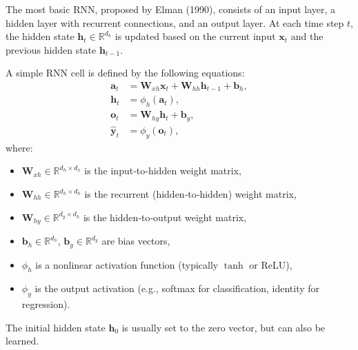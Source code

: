 \documentclass{tufte-handout}
\begin{document}
The most basic RNN, proposed by Elman (1990), consists of an input layer, a hidden layer with recurrent connections, and an output layer. At each time step $t$, the hidden state $\mathbf{h}_t \in \mathbb{R}^{d_h}$ is updated based on the current input $\mathbf{x}_t$ and the previous hidden state $\mathbf{h}_{t-1}$.

\begin{defn}
    A simple RNN cell is defined by the following equations:
    \begin{align}
        \mathbf{a}_t &= \mathbf{W}_{xh} \mathbf{x}_t + \mathbf{W}_{hh} \mathbf{h}_{t-1} + \mathbf{b}_h, \label{eq:rnn_pre} \\
        \mathbf{h}_t &= \phi_h(\mathbf{a}_t), \label{eq:rnn_hidden} \\
        \mathbf{o}_t &= \mathbf{W}_{hy} \mathbf{h}_t + \mathbf{b}_y, \label{eq:rnn_output} \\
        \hat{\mathbf{y}}_t &= \phi_y(\mathbf{o}_t), \label{eq:rnn_pred}
    \end{align}
    where:
    \begin{itemize}
        \item $\mathbf{W}_{xh} \in \mathbb{R}^{d_h \times d_x}$ is the input‑to‑hidden weight matrix,
        \item $\mathbf{W}_{hh} \in \mathbb{R}^{d_h \times d_h}$ is the recurrent (hidden‑to‑hidden) weight matrix,
        \item $\mathbf{W}_{hy} \in \mathbb{R}^{d_y \times d_h}$ is the hidden‑to‑output weight matrix,
        \item $\mathbf{b}_h \in \mathbb{R}^{d_h}$, $\mathbf{b}_y \in \mathbb{R}^{d_y}$ are bias vectors,
        \item $\phi_h$ is a nonlinear activation function (typically $\tanh$ or ReLU),
        \item $\phi_y$ is the output activation (e.g., softmax for classification, identity for regression).
    \end{itemize}
    The initial hidden state $\mathbf{h}_0$ is usually set to the zero vector, but can also be learned.
\end{defn}

\begin{marginfigure}
\centering
{}
\caption{Schematic of a single RNN cell. The hidden state $\mathbf{h}_t$ is fed back to the next time step.}
\end{marginfigure}
\end{document}
